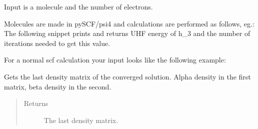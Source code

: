 \documentclass[letterpaper,10pt,english]{sphinxmanual}
\begin{document}
\begin{fulllineitems}
\label{\detokenize{cUHF_s:hf.HartreeFock.cUHF_s.MF}}
Input is a molecule and the number of electrons.

Molecules are made in pySCF/psi4 and calculations are performed as follows, eg.:
The following snippet prints and returns UHF energy of h\_3
and the number of iterations needed to get this value.

For a normal scf calculation your input looks like the following example:

\begin{sphinxVerbatim}[commandchars=\\\{\}]
   
          
   
\end{sphinxVerbatim}

\begin{fulllineitems}
\label{\detokenize{cUHF_s:hf.HartreeFock.cUHF_s.MF.get_dens}}
Gets the last density matrix of the converged solution.
Alpha density in the first matrix, beta density in the second.
\begin{quote}\begin{description}
\item[{Returns}] \leavevmode
The last density matrix.

\end{description}\end{quote}


\end{fulllineitems}
\end{fulllineitems}
\end{document}
